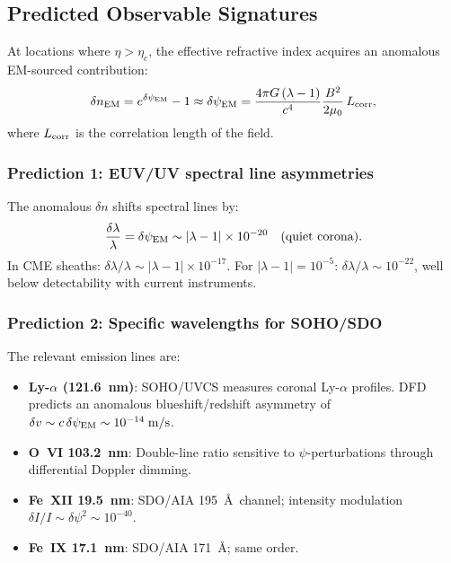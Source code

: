 \documentclass[aps,prd,twocolumn,superscriptaddress,floatfix,nofootinbib]{revtex4-2}
\newcommand{\lam}{\lambda}
\begin{document}
\subsection{Predicted Observable Signatures}\label{sec:signatures}

At locations where $\eta > \eta_c$, the effective refractive index
acquires an anomalous EM-sourced contribution:
\begin{equation}
\delta n_{\rm EM} = e^{\delta\psi_{\rm EM}} - 1
\approx \delta\psi_{\rm EM}
= \frac{4\pi G\,(\lam-1)}{c^4}\frac{B^2}{2\mu_0}\,L_{\rm corr},
\end{equation}
where $L_{\rm corr}$ is the correlation length of the field.

\subsubsection{Prediction 1: EUV/UV spectral line asymmetries}

The anomalous $\delta n$ shifts spectral lines by:
\begin{equation}
\frac{\delta\lambda}{\lambda} = \delta\psi_{\rm EM}
\sim |\lam-1| \times 10^{-20}\quad\text{(quiet corona)}.
\end{equation}
In CME sheaths: $\delta\lambda/\lambda \sim |\lam-1| \times 10^{-17}$.
For $|\lam-1| = 10^{-5}$: $\delta\lambda/\lambda \sim 10^{-22}$,
well below detectability with current instruments.

\subsubsection{Prediction 2: Specific wavelengths for SOHO/SDO}

The relevant emission lines are:
\begin{itemize}[nosep]
\item \textbf{Ly-$\alpha$ (121.6~nm)}: SOHO/UVCS measures coronal
Ly-$\alpha$ profiles. DFD predicts an anomalous blueshift/redshift
asymmetry of $\delta v \sim c\,\delta\psi_{\rm EM} \sim 10^{-14}\;\si{m/s}$.
\item \textbf{O~VI 103.2~nm}: Double-line ratio sensitive to
$\psi$-perturbations through differential Doppler dimming.
\item \textbf{Fe~XII 19.5~nm}: SDO/AIA 195~\AA\ channel; intensity
modulation $\delta I/I \sim \delta\psi^2 \sim 10^{-40}$.
\item \textbf{Fe~IX 17.1~nm}: SDO/AIA 171~\AA; same order.
\end{itemize}
\end{document}
